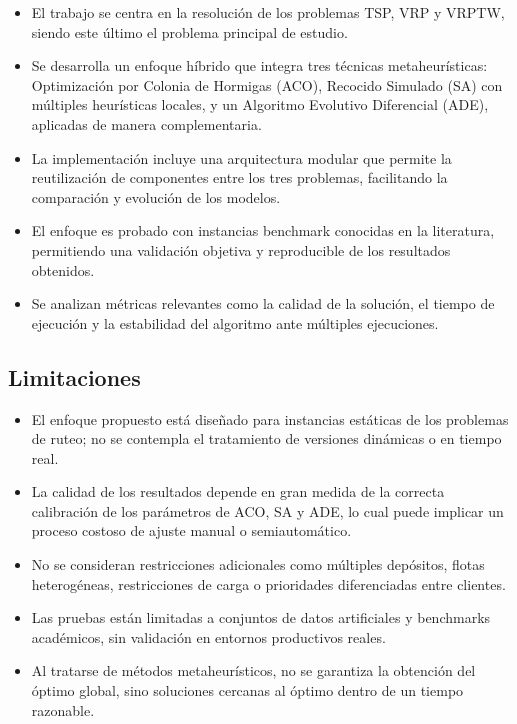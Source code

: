 \documentclass[12pt,titlepage,twoside,openright]{book}
\begin{document}
\begin{itemize}
	\item El trabajo se centra en la resolución de los problemas TSP, VRP y VRPTW, siendo este último el problema principal de estudio.

	\item Se desarrolla un enfoque híbrido que integra tres técnicas metaheurísticas: Optimización por Colonia de Hormigas (ACO), Recocido Simulado (SA) con múltiples heurísticas locales, y un Algoritmo Evolutivo Diferencial (ADE), aplicadas de manera complementaria.

	\item La implementación incluye una arquitectura modular que permite la reutilización de componentes entre los tres problemas, facilitando la comparación y evolución de los modelos.

	\item El enfoque es probado con instancias benchmark conocidas en la literatura, permitiendo una validación objetiva y reproducible de los resultados obtenidos.

	\item Se analizan métricas relevantes como la calidad de la solución, el tiempo de ejecución y la estabilidad del algoritmo ante múltiples ejecuciones.
\end{itemize}

\subsection*{Limitaciones}

\begin{itemize}
	\item El enfoque propuesto está diseñado para instancias estáticas de los problemas de ruteo; no se contempla el tratamiento de versiones dinámicas o en tiempo real.

	\item La calidad de los resultados depende en gran medida de la correcta calibración de los parámetros de ACO, SA y ADE, lo cual puede implicar un proceso costoso de ajuste manual o semiautomático.

	\item No se consideran restricciones adicionales como múltiples depósitos, flotas heterogéneas, restricciones de carga o prioridades diferenciadas entre clientes.

	\item Las pruebas están limitadas a conjuntos de datos artificiales y benchmarks académicos, sin validación en entornos productivos reales.

	\item Al tratarse de métodos metaheurísticos, no se garantiza la obtención del óptimo global, sino soluciones cercanas al óptimo dentro de un tiempo razonable.
\end{itemize}
\end{document}
